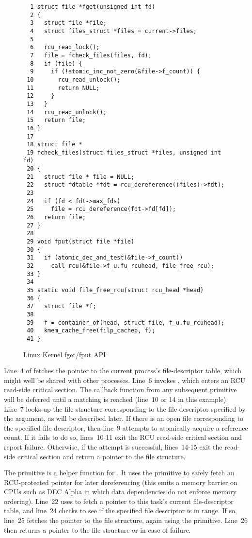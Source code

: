 \begin{figure}[htbp]
{ \scriptsize
\begin{verbatim}
  1 struct file *fget(unsigned int fd)
  2 {
  3   struct file *file;
  4   struct files_struct *files = current->files;
  5
  6   rcu_read_lock();
  7   file = fcheck_files(files, fd);
  8   if (file) {
  9     if (!atomic_inc_not_zero(&file->f_count)) {
 10       rcu_read_unlock();
 11       return NULL;
 12     }
 13   }
 14   rcu_read_unlock();
 15   return file;
 16 }
 17
 18 struct file *
 19 fcheck_files(struct files_struct *files, unsigned int fd)
 20 {
 21   struct file * file = NULL;
 22   struct fdtable *fdt = rcu_dereference((files)->fdt);
 23
 24   if (fd < fdt->max_fds)
 25     file = rcu_dereference(fdt->fd[fd]);
 26   return file;
 27 }
 28
 29 void fput(struct file *file)
 30 {
 31   if (atomic_dec_and_test(&file->f_count))
 32     call_rcu(&file->f_u.fu_rcuhead, file_free_rcu);
 33 }
 34
 35 static void file_free_rcu(struct rcu_head *head)
 36 {
 37   struct file *f;
 38
 39   f = container_of(head, struct file, f_u.fu_rcuhead);
 40   kmem_cache_free(filp_cachep, f);
 41 }
\end{verbatim}
}
\caption{Linux Kernel fget/fput API}
\label{fig:defer:Linux Kernel fget/fput API}
\end{figure}

Line~4 of  fetches the pointer to the current
process's file-descriptor table, which might well be shared
with other processes.
Line~6 invokes , which
enters an RCU read-side critical section.
The callback function from any subsequent  primitive
will be deferred until a matching  is reached
(line~10 or 14 in this example).
Line~7 looks up the file structure corresponding to the file
descriptor specified by the  argument, as will be
described later.
If there is an open file corresponding to the specified file descriptor,
then line~9 attempts to atomically acquire a reference count.
If it fails to do so, lines~10-11 exit the RCU read-side critical
section and report failure.
Otherwise, if the attempt is successful, lines~14-15 exit the read-side
critical section and return a pointer to the file structure.

The  primitive is a helper function for
.
It uses the  primitive to safely fetch an
RCU-protected pointer for later dereferencing (this emits a
memory barrier on CPUs such as DEC Alpha in which data dependencies
do not enforce memory ordering).
Line~22 uses  to fetch a pointer to this
task's current file-descriptor table,
and line~24 checks to see if the specified file descriptor is in range.
If so, line~25 fetches the pointer to the file structure, again using
the  primitive.
Line~26 then returns a pointer to the file structure or 
in case of failure.

